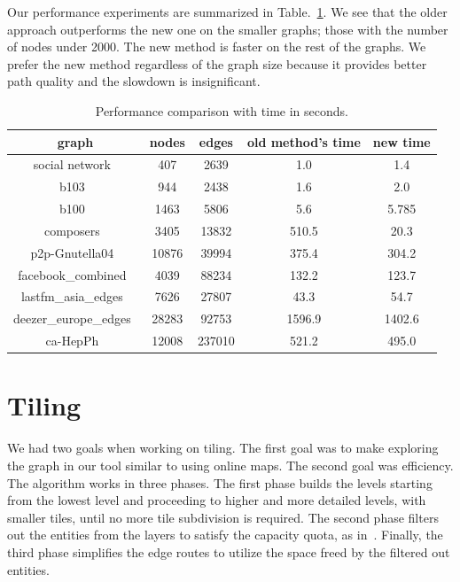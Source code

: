 \documentclass{gd-llncs}
\begin{document}
{Our performance experiments are summarized in Table.~\ref{tab:perf}. We see that the older approach outperforms the new one on the smaller graphs;
those with the number of nodes under 2000. The new method is faster on the rest of the graphs.
We prefer the new method regardless of the graph size because it provides better path quality and the slowdown is insignificant.

\begin{table}
  \begin{center}
    \begin{tabular}{||c |c| c| c| c||}
      \hline
      graph                                   & nodes & edges  & old method's time & new time \\ [0.5ex]
      \hline\hline
      social network~\cite{beveridge2018game} & 407   & 2639   & 1.0               & 1.4      \\
      \hline
      b103~\cite{b103}                        & 944   & 2438   & 1.6               & 2.0      \\
      \hline
      b100~\cite{b100}                        & 1463  & 5806   & 5.6               & 5.785    \\
      \hline
      composers~\cite{composers}              & 3405  & 13832  & 510.5             & 20.3     \\
      \hline
      p2p-Gnutella04~\cite{gnutella}          & 10876 & 39994  & 375.4             & 304.2    \\
      \hline
      facebook\_combined~\cite{fb}            & 4039  & 88234  & 132.2             & 123.7    \\
      \hline
      lastfm\_asia\_edges~\cite{feather}      & 7626  & 27807  & 43.3              & 54.7     \\
      \hline
      deezer\_europe\_edges~\cite{feather}    & 28283 & 92753  & 1596.9            & 1402.6   \\
      \hline
      ca-HepPh~\cite{leskovec2007graph}       & 12008 & 237010 & 521.2             & 495.0    \\
      \hline
    \end{tabular}
    \caption{Performance comparison with time in seconds.}
    \label{tab:perf}
  \end{center}

\end{table}
\section{Tiling}
We had two goals when working on tiling. The first goal was to make exploring the graph in our tool similar to using online maps. The second goal was efficiency.
The algorithm works in three phases. The first phase builds the levels starting from the lowest level and proceeding to higher and more detailed levels, with smaller tiles, until no more tile subdivision is required. The second phase filters out the entities from the layers to satisfy the capacity quota, as in~\cite{nachmanson2015graphmaps}. Finally, the third phase simplifies the edge routes to utilize the space freed by the filtered out entities.


}
\end{document}
